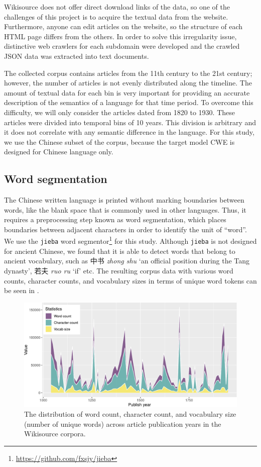 \documentclass[output=paper]{langsci/langscibook}
\begin{document}
Wikisource does not offer direct download links of the data, so one of the challenges of this project is to acquire the textual data from the website. Furthermore, anyone can edit articles on the website, so the structure of each HTML page differs from the others. In order to solve this irregularity issue, distinctive web crawlers for each subdomain were developed and the crawled JSON data was extracted into text documents. 

The collected corpus contains articles from the 11th century to the 21st century; however, the number of articles is not evenly distributed along the timeline. The amount of textual data for each bin is very important for providing an accurate description of the semantics of a language for that time period. To overcome this difficulty, we will only consider the articles dated from 1820 to 1930. These articles were divided into temporal bins of 10 years. This division is arbitrary and it does not correlate with any semantic difference in the language. 
For this study, we use the Chinese subset of the corpus, because the target model CWE is designed for Chinese language only. 

\subsection{Word segmentation}
The Chinese written language is printed without marking boundaries between words, like the blank space that is commonly used in other languages. 
Thus, it requires a preprocessing step known as word segmentation, which places boundaries between adjacent characters in order to identify the unit of ``word''.
We use the \texttt{jieba} word segmentor\footnote{\url{https://github.com/fxsjy/jieba}} for this study. Although \texttt{jieba} is not designed for ancient Chinese, we found that it is able to detect words that belong to ancient vocabulary, such as {\cjkfont 中书} \textit{zhong shu} `an official position during the Tang dynasty', {\cjkfont 若夫} \textit{ruo ru} `if' etc.
The resulting corpus data with various word counts, character counts, and vocabulary sizes in terms of unique word tokens can be seen in .

\begin{figure}
\centering
\includegraphics[width=\linewidth]{figures/XU_word_char_vocab_vs_year.pdf}
\caption{The distribution of word count, character count, and vocabulary size (number of unique words) across article publication years in the Wikisource corpora.}\label{fig:corpus_stats}
\end{figure}
\end{document}

